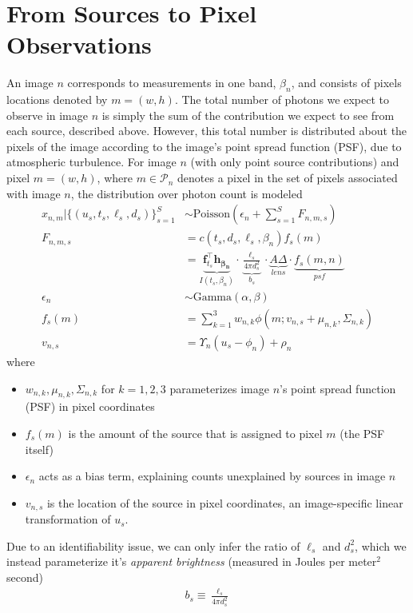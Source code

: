\documentclass[11pt]{article}
\newcommand{\trans}{\intercal}
\begin{document}
\section{From Sources to Pixel Observations}
An image $n$ corresponds to measurements in one band, $\beta_n$, and consists of pixels locations denoted by $m = (w,h)$.  The total number of photons we expect to observe in image $n$ is simply the sum of the contribution we expect to see from each source, described above.  However, this total number is distributed about the pixels of the image according to the image's point spread function (PSF), due to atmospheric turbulence.  For image $n$ (with only point source contributions) and pixel $m = (w,h)$, where $m \in \mathcal{P}_n$ denotes a pixel in the set of pixels associated with image $n$, the distribution over photon count is modeled
\begin{align}
  x_{n,m} | \{(u_s, t_s, \ell_s, d_s)\}_{s=1}^S &\sim \textrm{Poisson}( \epsilon_n + \sum_{s=1}^S F_{n,m,s} ) \\
  F_{n,m,s} 
    &= c(t_s, d_s, \ell_s, \beta_n) f_s(m)  \\
    &= \underbrace{\mathbf{f}_{t_s}^\trans \mathbf{h_{\beta_n}}}_{I(t_s, \beta_n)} \cdot 
       \underbrace{\frac{\ell_s}{4 \pi d_s^2}}_{b_s} \cdot
       \underbrace{A \Delta}_{lens} \cdot 
       \underbrace{f_s(m,n)}_{psf} \\
 \epsilon_n &\sim \textrm{Gamma}(\alpha, \beta) \\
  f_s(m)  &= \sum_{k=1}^3 w_{n,k} \phi(m; v_{n,s} + \mu_{n,k}, \Sigma_{n,k}) \\
  v_{n,s} &= \Upsilon_n(u_s - \phi_n) + \rho_n
\end{align}
where 
\begin{itemize}
  \item $w_{n,k}, \mu_{n,k}, \Sigma_{n,k}$ for $k=1,2,3$ parameterizes image $n$'s point spread function (PSF) in pixel coordinates
  \item $f_s(m)$ is the amount of the source that is assigned to pixel $m$ (the PSF itself)
  \item $\epsilon_n$ acts as a bias term, explaining counts unexplained by sources in image $n$ 
  \item $v_{n,s}$ is the location of the source in pixel coordinates, an image-specific linear transformation of $u_s$. 
\end{itemize}
Due to an identifiability issue, we can only infer the ratio of $\ell_s$ and $d_s^2$, which we instead parameterize it's \emph{apparent brightness} (measured in Joules per meter$^2$ second)
\begin{align}
  b_s \equiv \frac{\ell_s}{4 \pi d_s^2}
\end{align}
\end{document}
